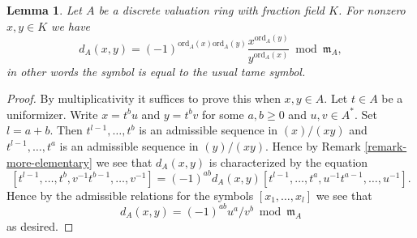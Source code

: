 \documentclass[10pt,a4paper]{amsart}
\theoremstyle{plain}
\newtheorem{lemma}[subsection]{Lemma}
\theoremstyle{definition}
\theoremstyle{remark}
\numberwithin{equation}{subsection}
\begin{document}
\begin{lemma}
\label{lemma-symbol-is-usual-tame-symbol}
Let $A$ be a discrete valuation ring with fraction field $K$.
For nonzero $x, y \in K$ we have
$$
d_A(x, y)
=
(-1)^{\text{ord}_A(x)\text{ord}_A(y)}
\frac{x^{\text{ord}_A(y)}}{y^{\text{ord}_A(x)}} \bmod \mathfrak m_A,
$$
in other words the symbol is equal to the usual tame symbol.
\end{lemma}

\begin{proof}
By multiplicativity it suffices to prove this when $x, y \in A$.
Let $t \in A$ be a uniformizer.
Write $x = t^bu$ and $y = t^bv$ for some $a, b \geq 0$
and $u, v \in A^*$. Set $l = a + b$. Then
$t^{l - 1}, \ldots, t^b$ is an admissible sequence in
$(x)/(xy)$ and $t^{l - 1}, \ldots, t^a$ is an admissible
sequence in $(y)/(xy)$. Hence by Remark \ref{remark-more-elementary}
we see that $d_A(x, y)$ is characterized by the equation
$$
[t^{l - 1}, \ldots, t^b, v^{-1}t^{b - 1}, \ldots, v^{-1}]
=
(-1)^{ab} d_A(x, y)
[t^{l - 1}, \ldots, t^a, u^{-1}t^{a - 1}, \ldots, u^{-1}].
$$
Hence by the admissible relations for the
symbols $[x_1, \ldots, x_l]$ we see that
$$
d_A(x, y) = (-1)^{ab} u^a/v^b \bmod \mathfrak m_A
$$
as desired.
\end{proof}
\end{document}
